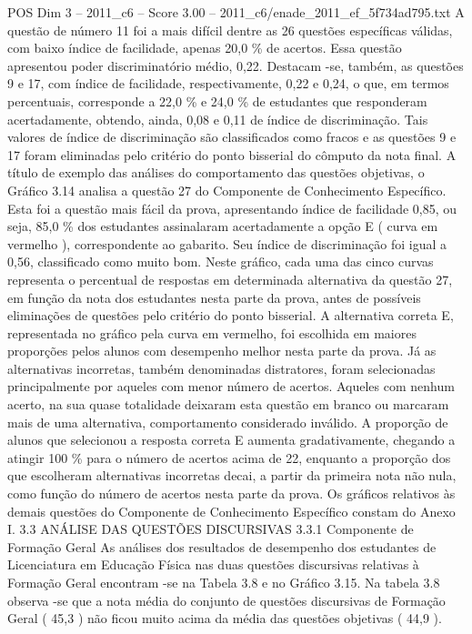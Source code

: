 \begin{textsample}{POS Dim 3 – 2011\_c6 – Score 3.00 – 2011\_c6/enade\_2011\_ef\_5f734ad795.txt}
A questão de número 11 foi a mais difícil dentre as 26 questões específicas válidas, com baixo índice de facilidade, apenas 20,0 \% de acertos.
Essa questão apresentou poder discriminatório médio, 0,22.
Destacam -se, também, as questões 9 e 17, com índice de facilidade, respectivamente, 0,22 e 0,24, o que, em termos percentuais, corresponde a 22,0 \% e 24,0 \% de estudantes que responderam acertadamente, obtendo, ainda, 0,08 e 0,11 de índice de discriminação.
Tais valores de índice de discriminação são classificados como fracos e as questões 9 e 17 foram eliminadas pelo critério do ponto bisserial do cômputo da nota final.
A título de exemplo das análises do comportamento das questões objetivas, o Gráfico 3.14 analisa a questão 27 do Componente de Conhecimento Específico.
Esta foi a questão mais fácil da prova, apresentando índice de facilidade 0,85, ou seja, 85,0 \% dos estudantes assinalaram acertadamente a opção E ( curva em vermelho ), correspondente ao gabarito.
Seu índice de discriminação foi igual a 0,56, classificado como muito bom.
Neste gráfico, cada uma das cinco curvas representa o percentual de respostas em determinada alternativa da questão 27, em função da nota dos estudantes nesta parte da prova, antes de possíveis eliminações de questões pelo critério do ponto bisserial.
A alternativa correta E, representada no gráfico pela curva em vermelho, foi escolhida em maiores proporções pelos alunos com desempenho melhor nesta parte da prova.
Já as alternativas incorretas, também denominadas distratores, foram selecionadas principalmente por aqueles com menor número de acertos.
Aqueles com nenhum acerto, na sua quase totalidade deixaram esta questão em branco ou marcaram mais de uma alternativa, comportamento considerado inválido.
A proporção de alunos que selecionou a resposta correta E aumenta gradativamente, chegando a atingir 100 \% para o número de acertos acima de 22, enquanto a proporção dos que escolheram alternativas incorretas decai, a partir da primeira nota não nula, como função do número de acertos nesta parte da prova.
Os gráficos relativos às demais questões do Componente de Conhecimento Específico constam do Anexo I. 3.3 ANÁLISE DAS QUESTÕES DISCURSIVAS 3.3.1 Componente de Formação Geral As análises dos resultados de desempenho dos estudantes de Licenciatura em Educação Física nas duas questões discursivas relativas à Formação Geral encontram -se na Tabela 3.8 e no Gráfico 3.15.
Na tabela 3.8 observa -se que a nota média do conjunto de questões discursivas de Formação Geral ( 45,3 ) não ficou muito acima da média das questões objetivas ( 44,9 ).

\end{textsample}
